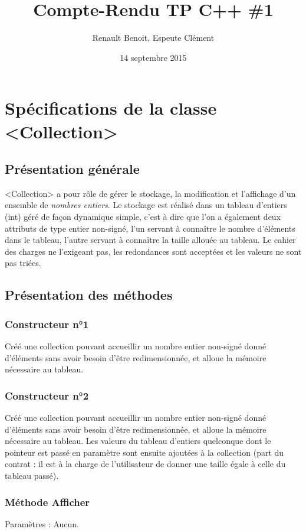 \documentclass[11pt]{article}
\title{Compte-Rendu TP C++ \#1}
\author{{\sc Renault} Benoit, {\sc Espeute} Clément}
\date{14 septembre 2015}
\begin{document}
\pagestyle{fancy}
\maketitle

\section{Spécifications de la classe <Collection>}

\subsection{Présentation générale}
<Collection> a pour rôle de gérer le stockage, la modification et l'affichage d'un ensemble de \emph{nombres entiers}. Le stockage est réalisé dans un tableau d'entiers (int) géré de façon dynamique simple, c'est à dire que l'on a également deux attributs de type entier non-signé, l'un servant à connaître le nombre d'éléments dans le tableau, l'autre servant à connaître la taille allouée au tableau. Le cahier des charges ne l'exigeant pas, les redondances sont acceptées et les valeurs ne sont pas triées.

\subsection{Présentation des méthodes}

\subsubsection*{Constructeur n°1}
Créé une collection pouvant accueillir un nombre entier non-signé donné d'éléments sans avoir besoin d'être redimensionnée, et alloue la mémoire nécessaire au tableau.

\subsubsection*{Constructeur n°2}
Créé une collection pouvant accueillir un nombre entier non-signé donné d'éléments sans avoir besoin d'être redimensionnée, et alloue la mémoire nécessaire au tableau. Les valeurs du tableau d'entiers quelconque dont le pointeur est passé en paramètre sont ensuite ajoutées à la collection (part du contrat : il est à la charge de l’utilisateur de donner une taille égale à celle du tableau passé).

\subsubsection*{Méthode Afficher}
Paramètres : Aucun.
\end{document}
